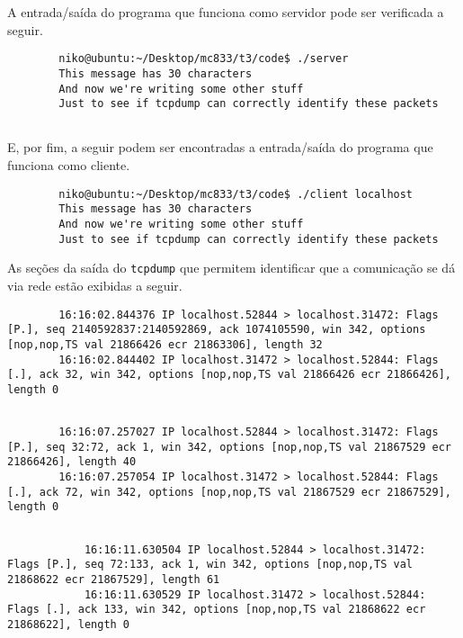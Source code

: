 \documentclass[a4paper,10pt]{article}
\begin{document}
    A entrada/saída do programa que funciona como servidor pode ser verificada a seguir.
    
    \begin{lstlisting}
        niko@ubuntu:~/Desktop/mc833/t3/code$ ./server
        This message has 30 characters
        And now we're writing some other stuff
        Just to see if tcpdump can correctly identify these packets
    
    \end{lstlisting}
    
    E, por fim, a seguir podem ser encontradas a entrada/saída do programa que funciona como cliente.
    
    \begin{lstlisting}
        niko@ubuntu:~/Desktop/mc833/t3/code$ ./client localhost
        This message has 30 characters
        And now we're writing some other stuff
        Just to see if tcpdump can correctly identify these packets

    \end{lstlisting}

    As seções da saída do {\tt tcpdump} que permitem identificar que a comunicação se dá via rede estão exibidas a seguir.
    
    \begin{lstlisting}
        16:16:02.844376 IP localhost.52844 > localhost.31472: Flags [P.], seq 2140592837:2140592869, ack 1074105590, win 342, options [nop,nop,TS val 21866426 ecr 21863306], length 32
        16:16:02.844402 IP localhost.31472 > localhost.52844: Flags [.], ack 32, win 342, options [nop,nop,TS val 21866426 ecr 21866426], length 0
        
    \end{lstlisting}

    \begin{lstlisting}
        16:16:07.257027 IP localhost.52844 > localhost.31472: Flags [P.], seq 32:72, ack 1, win 342, options [nop,nop,TS val 21867529 ecr 21866426], length 40
        16:16:07.257054 IP localhost.31472 > localhost.52844: Flags [.], ack 72, win 342, options [nop,nop,TS val 21867529 ecr 21867529], length 0
    
    \end{lstlisting}
    
    \begin{lstlisting}
            16:16:11.630504 IP localhost.52844 > localhost.31472: Flags [P.], seq 72:133, ack 1, win 342, options [nop,nop,TS val 21868622 ecr 21867529], length 61
            16:16:11.630529 IP localhost.31472 > localhost.52844: Flags [.], ack 133, win 342, options [nop,nop,TS val 21868622 ecr 21868622], length 0
    \end{lstlisting}
\end{document}
